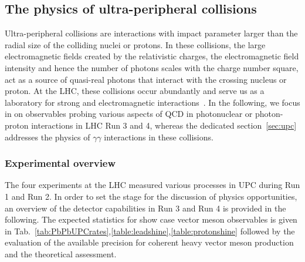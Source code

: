 \documentclass[../report.tex]{subfiles}
\begin{document}
\subsection{The physics of ultra-peripheral collisions}
\label{sec:UPCqcd}
Ultra-peripheral collisions are interactions with impact parameter larger than the radial size of the colliding nuclei or protons. In these collisions, the large electromagnetic fields created by the relativistic charges, the electromagnetic field intensity and hence the number of photons scales with the charge number square, act as a source of quasi-real photons that interact with the crossing nucleus or proton. At the LHC, these collisions occur abundantly and serve us as a laboratory for strong and electromagnetic interactions~\cite{Baltz:2007kq}. In the following, we focus in on observables probing various aspects of QCD in photonuclear or photon-proton interactions in LHC Run 3 and 4, whereas the dedicated section~\ref{sec:upc} addresses the physics of $\gamma\gamma$ interactions in these collisions. 

\subsubsection{Experimental overview}
The four experiments at the LHC measured various processes in UPC during Run 1 and Run 2. In order to set the stage for the discussion of physics opportunities,  an overview of the detector capabilities in Run 3 and Run 4 is provided in the following. The expected statistics for show case vector meson observables is given in Tab.~\ref{tab:PbPbUPCrates},\ref{table:leadshine},\ref{table:protonshine} followed by the evaluation of the available precision for coherent heavy vector meson production and the theoretical assessment.
\end{document}

